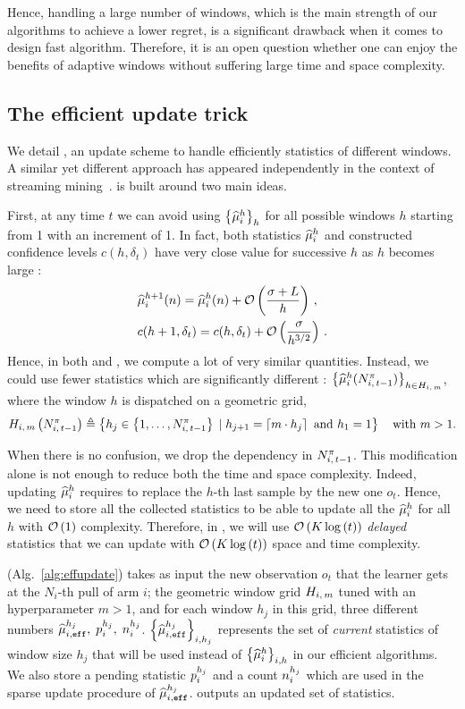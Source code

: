 Hence, handling a large number of windows, which is the main strength of our algorithms to achieve a lower regret, is a significant drawback when it comes to design fast algorithm. Therefore, it is an open question whether one can enjoy the benefits of adaptive windows without suffering large time and space complexity. 

\subsection{The efficient update trick}
We detail \EFF, an update scheme to handle efficiently statistics of different windows. A similar yet different approach has appeared independently in the context of streaming mining~\citep{bifet2007learning}. \EFF is built around two main ideas.

First, at any time $t$ we can avoid using $\left\{\widehat{\mu}_i^h\right\}_{h}$ for all possible windows $h$ starting from 1 with an increment of 1. In fact, both statistics $\widehat{\mu}_i^h$ and constructed confidence levels $c(h, \delta_t)$  have very close value for successive $h$ as $h$ becomes large : 
\begin{align*}
& \widehat{\mu}_i^{h+1}(n) = \widehat{\mu}_i^{h}(n) + \mathcal{O}\left(\frac{\sigma + L}{h}\right)\,,\\
& c(h+1, \delta_t) = c(h, \delta_t) + \mathcal{O}\left(\frac{\sigma }{h^{3/2}}\right) \,.
\end{align*}
Hence, in both \FEWA and \RUCB, we compute a lot of very similar quantities. Instead, we could use fewer statistics which are significantly different : $\left\{\widehat{\mu}_i^h(N_{i,\,t-1}^\pi)\right\}_{h\in H_{i,\,m}}$, where the window $h$ is dispatched on a geometric grid, 
 \[H_{i,\,m}\left(N_{i,\,t-1}^\pi\right) \triangleq \left\{ h_j \in  \left\{1, \dots , N_{i,\,t-1}^\pi \right\} \;|\; h_{j+1} = \left\lceil m \cdot h_j\right\rceil \text{ and } h_1 = 1\right\}\quad \text{with } m > 1.\]

When there is no confusion, we drop the dependency in $N_{i,\,t-1}^\pi$.  This modification alone is not enough to reduce both the time and space complexity. Indeed, updating $\widehat{\mu}^h_{i}$ requires to replace the $h$-th last sample by the new one $o_t$. Hence, we need to store all the collected statistics to be able to update all the $\widehat{\mu}^h_{i}$ for all $h$ with $\mathcal{O}\left(1\right)$ complexity. Therefore, in \EFF, we will use $\mathcal{O}\left(K\log\left(t\right)\right)$ \emph{delayed} statistics that we can update with $\mathcal{O}\left(K\log\left(t\right)\right)$ space and time complexity.

\EFF (Alg.~\ref{alg:effupdate}) takes as input the new observation $o_t$ that the learner gets at the $N_i$-th pull of arm $i$; the geometric window grid $H_{i,\,m}$ tuned with an hyperparameter $m>1$, and for each window $h_j$ in this grid, three different numbers $\widehat{\mu}_{i,\texttt{eff}}^{h_j},\; p_i^{h_j}, \; n_i^{h_j}$. $\left\{\widehat{\mu}_{i,\texttt{eff}}^{h_j}\right\}_{i,h_j}$ represents the set of \emph{current} statistics of window size $h_j$ that will be used instead of $\left\{\widehat{\mu}_i^h\right\}_{i,h}$ in our efficient algorithms. We also store a pending statistic $p_i^{h_j}$ and a count $n_i^{h_j}$  which are used in the sparse update procedure of $\widehat{\mu}_{i,\texttt{eff}}^{h_j}$. \EFF outputs an updated set of statistics.  

